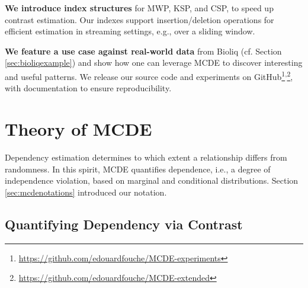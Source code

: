 \textbf{We introduce index structures} for \gls{MWP}, \gls{KSP}, and \gls{CSP}, to speed up contrast estimation. Our indexes support insertion/deletion operations for efficient estimation in streaming settings, e.g., over a sliding window.

\textbf{We feature a use case against real-world data} from \gls{Bioliq} (cf. Section \ref{sec:bioliqexample}) and show how one can leverage \gls{MCDE} to discover interesting and useful patterns. We release our source code and experiments on GitHub\footnote{\url{https://github.com/edouardfouche/MCDE-experiments}}\textsuperscript{,}\footnote{\url{https://github.com/edouardfouche/MCDE-extended}}, with documentation to ensure reproducibility.

\section{Theory of \acrshort{MCDE}}

Dependency estimation determines to which extent a relationship differs from randomness. In this spirit, \gls{MCDE} quantifies dependence, i.e., a degree of independence violation, based on marginal and conditional distributions. Section \ref{sec:mcdenotations} introduced our notation. 

\subsection{Quantifying Dependency via Contrast}

